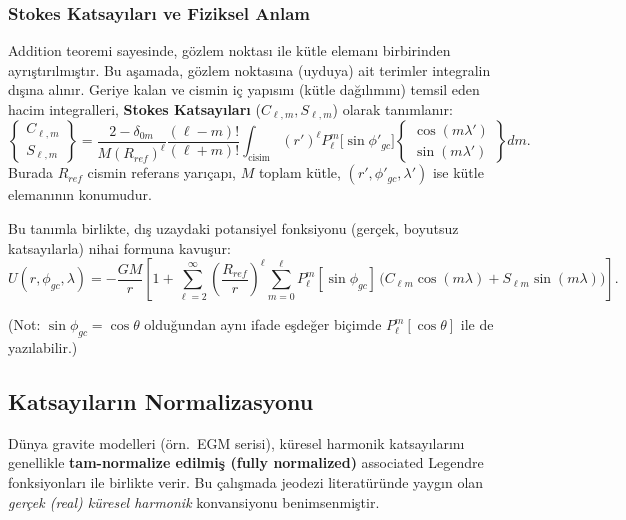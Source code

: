 \subsubsection{Stokes Katsayıları ve Fiziksel Anlam}

Addition teoremi sayesinde, gözlem noktası ile kütle elemanı birbirinden ayrıştırılmıştır.
Bu aşamada, gözlem noktasına (uyduya) ait terimler integralin dışına alınır.
Geriye kalan ve cismin iç yapısını (kütle dağılımını) temsil eden hacim integralleri,
\textbf{Stokes Katsayıları} ($C_{\ell, m}, S_{\ell, m}$) olarak tanımlanır:
\begin{equation}
\left\{
\begin{aligned}
C_{\ell, m} \\
S_{\ell, m}
\end{aligned}
\right\}
=
\frac{2-\delta_{0m}}{M (R_{ref})^\ell} \frac{(\ell-m)!}{(\ell+m)!}
\int_{\text{cisim}} (r')^\ell P_{\ell}^{m}\!\bigl[\sin\phi'_{gc}\bigr]
\left\{
\begin{aligned}
\cos(m\lambda') \\
\sin(m\lambda')
\end{aligned}
\right\}
dm.
\label{eq:stokes_coefficients_integral}
\end{equation}
Burada $R_{ref}$ cismin referans yarıçapı, $M$ toplam kütle, $(r',\phi'_{gc},\lambda')$ ise kütle elemanının konumudur.

Bu tanımla birlikte, dış uzaydaki potansiyel fonksiyonu (gerçek, boyutsuz katsayılarla) nihai formuna kavuşur:
\begin{equation}
U(r,\phi_{gc},\lambda)
=
-\frac{GM}{r}\left[
1+
\sum_{\ell=2}^{\infty}\left(\frac{R_{ref}}{r}\right)^{\ell}
\sum_{m=0}^{\ell}
P_\ell^m[\sin\phi_{gc}]\,
\Big(
C_{\ell m}\cos(m\lambda)+S_{\ell m}\sin(m\lambda)
\Big)
\right].
\label{eq:final_potential_corrected}
\end{equation}

\noindent
(Not: $\sin\phi_{gc}=\cos\theta$ olduğundan aynı ifade eşdeğer biçimde $P_\ell^m[\cos\theta]$ ile de yazılabilir.)


\newpage
\subsection{Katsayıların Normalizasyonu}
\label{subsec:normalization}

Dünya gravite modelleri (örn.\ EGM serisi),
küresel harmonik katsayılarını genellikle
\textbf{tam-normalize edilmiş (fully normalized)}
associated Legendre fonksiyonları ile birlikte verir.
Bu çalışmada jeodezi literatüründe yaygın olan
\emph{gerçek (real) küresel harmonik} konvansiyonu benimsenmiştir.

